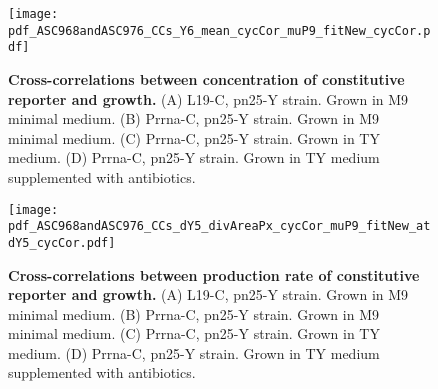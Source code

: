 

\begin{figure}
    \centering
    \texttt{[image: pdf\_ASC968andASC976\_CCs\_Y6\_mean\_cycCor\_muP9\_fitNew\_cycCor.pdf]}
    \caption{ 
        \textbf{Cross-correlations between concentration of constitutive reporter and growth.}
        (A) L19-C, pn25-Y strain. Grown in M9 minimal medium.
        (B) Prrna-C, pn25-Y strain. Grown in M9 minimal medium.
        (C) Prrna-C, pn25-Y strain. Grown in TY medium.
        (D) Prrna-C, pn25-Y strain. Grown in TY medium supplemented with antibiotics.
    }
    \label{fig:ribo:CCsEmuY}
\end{figure}

\begin{figure}
    \centering
    \texttt{[image: pdf\_ASC968andASC976\_CCs\_dY5\_divAreaPx\_cycCor\_muP9\_fitNew\_atdY5\_cycCor.pdf]}
    \caption{ 
        \textbf{Cross-correlations between production rate of constitutive reporter and growth.}
        (A) L19-C, pn25-Y strain. Grown in M9 minimal medium.
        (B) Prrna-C, pn25-Y strain. Grown in M9 minimal medium.
        (C) Prrna-C, pn25-Y strain. Grown in TY medium.
        (D) Prrna-C, pn25-Y strain. Grown in TY medium supplemented with antibiotics.
    }
    \label{fig:ribo:CCsPmuY}
\end{figure}

